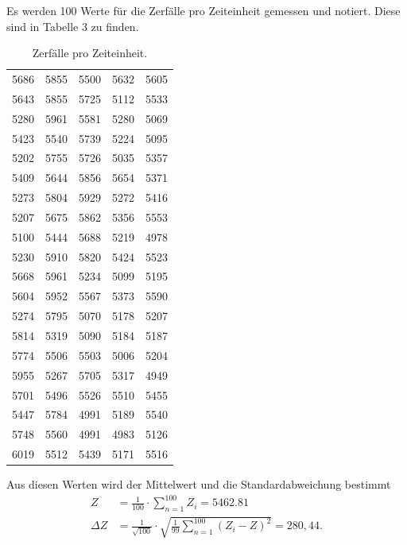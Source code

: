 Es werden 100 Werte für die Zerfälle pro Zeiteinheit gemessen und notiert. Diese sind in Tabelle 3 zu finden.
\begin{table}[H]
  \centering
  \caption{Zerfälle pro Zeiteinheit.}
  \label{tab:Parameter}
  \begin{tabular}{c c c c c}
    \bottomrule
     5686&5855 &5500&5632&5605 \\
     5643&5855 &5725   &5112&5533 \\
     5280&5961  &5581  &5280&5069 \\
     5423&5540  &5739  &5224 &5095 \\
     5202&5755  &5726  &5035 &5357 \\
     5409&5644  &5856  &5654   &5371 \\
     5273&5804  &5929  &5272     &5416 \\
     5207&5675  &5862  &5356     &5553 \\
     5100&5444  &5688  &5219     &4978 \\
     5230&5910  &5820  &5424     &5523 \\
     5668&5961  &5234  &5099     &5195 \\
     5604&5952  &5567  &5373     &5590 \\
     5274&5795  &5070  &5178     &5207 \\
     5814&5319  &5090  &5184     &5187 \\
     5774&5506  &5503  &5006     &5204 \\
     5955&5267  &5705  &5317     &4949 \\
     5701&5496  &5526  &5510 &5455 \\
     5447&5784  &4991  &5189     &5540 \\
     5748&5560  &4991  &4983     &5126 \\
     6019&5512  &5439  &5171     &5516 \\
  \bottomrule
  \end{tabular}
\end{table}

\noindent Aus diesen Werten wird der Mittelwert und die Standardabweichung bestimmt
\begin{align*}
Z &= \frac{1}{100}\cdot \sum_{n=1}^{100} Z_i = 5462.81 \\
\Delta Z &=\frac{1}{\sqrt{100}} \cdot \sqrt{\frac{1}{99} \sum_{n=1}^{100} (Z_i - Z)^2} = 280,44.
\end{align*}

